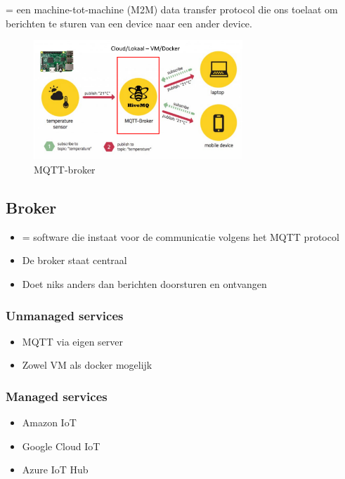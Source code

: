 \documentclass{article}
\begin{document}
= een machine-tot-machine (M2M) data transfer protocol die ons toelaat om berichten te sturen van een device naar een ander device.

\begin{figure}[H]
    \centering
    \includegraphics[width=0.7\textwidth]{mqtt.png}
    \caption{MQTT-broker}
\end{figure}

\subsection{Broker}

\begin{itemize}
    \item = software die instaat voor de communicatie volgens het MQTT protocol
    \item De broker staat centraal
    \item Doet niks anders dan berichten doorsturen en ontvangen
\end{itemize}

\subsubsection{Unmanaged services}

\begin{itemize}
    \item MQTT via eigen server
    \item Zowel VM als docker mogelijk
\end{itemize}

\subsubsection{Managed services}
\begin{itemize}
    \item Amazon IoT
    \item Google Cloud IoT
    \item Azure IoT Hub
\end{itemize}
\end{document}
